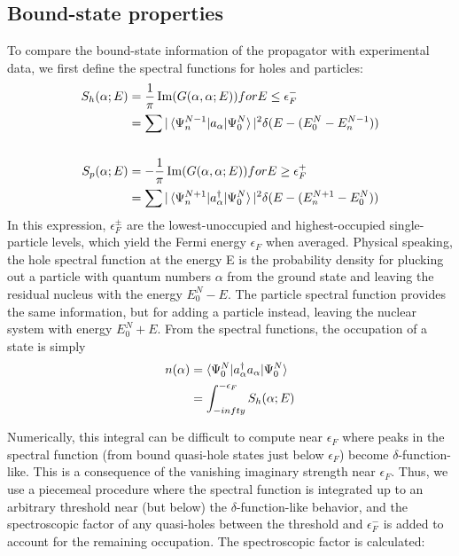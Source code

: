 \subsection{Bound-state properties}
To compare the bound-state information of the propagator with experimental data, we first
define the spectral functions for holes and particles:
\begin{equation}
    \begin{split}
        S_{h}(\alpha; E) & =
        \frac{1}{\pi}\operatorname{Im}({G(\alpha,\alpha;E)}) for E\leq\epsilon_{F}^{-}\\
        & = \sum|\braket{\Psi^{N-1}_{n}|a_{\alpha}|\Psi^{N}_{0}}|^{2}
        \delta(E-(E^{N}_{0}-E_{n}^{N-1}))\\
        \\
        S_{p}(\alpha; E) & =
        -\frac{1}{\pi}\operatorname{Im}({G(\alpha,\alpha;E)}) for E\geq\epsilon_{F}^{+}\\
        & = \sum|\braket{\Psi^{N+1}_{n}|a_{\alpha}^{\dagger}|\Psi^{N}_{0}}|^{2}
        \delta(E-(E_{n}^{N+1}-E^{N}_{0}))
    \end{split}
\end{equation}
\noindent
In this expression, $\epsilon_{F}^{\pm}$ are the lowest-unoccupied and highest-occupied
single-particle levels, which yield the Fermi energy $\epsilon_{F}$ when averaged. Physical
speaking, the hole spectral function at the energy E is the probability density for plucking out
a particle with quantum numbers $\alpha$ from the ground state and leaving the residual nucleus with the
energy $E^{N}_{0}-E$. The particle spectral function provides the same information, but for adding a
particle instead, leaving the nuclear system with energy $E^{N}_{0}+E$. From the spectral functions, the occupation of a state is simply
\begin{equation} \label{ParticleNumber}
    \begin{split}
        n(\alpha) & = \braket{\Psi^{N}_{0}|a_{\alpha}^{\dagger}a_{\alpha}|\Psi^{N}_{0}}\\
        & = \int_{-infty}^{-\epsilon_{F}}S_{h}(\alpha; E)
    \end{split}
\end{equation}

\noindent
Numerically, this integral can be difficult to compute near $\epsilon_{F}$ where peaks in the
spectral function (from bound quasi-hole states just below $\epsilon_{F}$) become $\delta$-function-like. 
This is a consequence of the vanishing imaginary strength near $\epsilon_{F}$. Thus, we use a piecemeal procedure
where the spectral function is integrated up to an arbitrary threshold near (but below) the
$\delta$-function-like behavior, and the spectroscopic factor of any quasi-holes between the threshold and
$\epsilon_{F}^{-}$ is added to account for the remaining occupation. The spectroscopic factor is
calculated:
\begin{equation}
    [insert spectroscopic factor calculation]
\end{equation}


